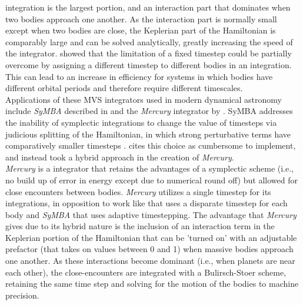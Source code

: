 \documentclass{aastex631}
\begin{document}
integration is the largest portion, and an interaction part that dominates when two bodies 
approach one another. As the interaction part is normally small except when two bodies are close, the Keplerian part of the Hamiltonian is comparably large and can be solved
analytically, greatly increasing the speed of the integrator.
\cite{sah94} showed that the limitation of a fixed timestep could be partially overcome by assigning a different timestep to different bodies in an integration. This
can lead to an increase in efficiency for systems in which bodies have different orbital periods and therefore require different timescales. \\
\indent Applications of these MVS integrators used in modern dynamical astronomy include \textit{SyMBA} described in \cite{dun98} and the \textit{Mercury} 
integrator by \cite{cha99}. SyMBA addresses the inability of symplectic integrations to change the value of timesteps via judicious splitting of the Hamiltonian,
in which strong perturbative terms have comparatively smaller timesteps \citep{dun98}. \cite{cha99} cites this choice as cumbersome to implement, and instead 
took a hybrid approach in the creation of \textit{Mercury}. \\
\indent \textit{Mercury}
  is a \cite{wis91} integrator that retains the advantages of a symplectic scheme 
(i.e., no build up of error in energy except due to numerical round off) but allowed for close encounters between bodies. \textit{Mercury} utilizes a single timestep 
for its integrations, in opposition to work like \cite{sah94} that uses a disparate timestep for each body and \textit{SyMBA} that uses adaptive timestepping. The 
advantage that \textit{Mercury} gives due to its hybrid nature is the inclusion of an interaction term in the Keplerian portion of the 
Hamiltonian that can be 'turned on' with an adjustable prefactor (that takes on values between 0 and 1) when massive bodies approach one another. As these interactions
become dominant (i.e., when planets are near each other), the close-encounters are integrated with a Bulirsch-Stoer scheme, retaining the same time step and solving 
for the motion of the bodies to machine precision.
\end{document}
